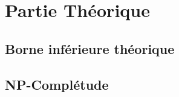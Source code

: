 \section{Partie Théorique}
\subsection{Borne inférieure théorique}
\subsection{NP-Complétude}
\noindent
%
%
%
%
%
%
